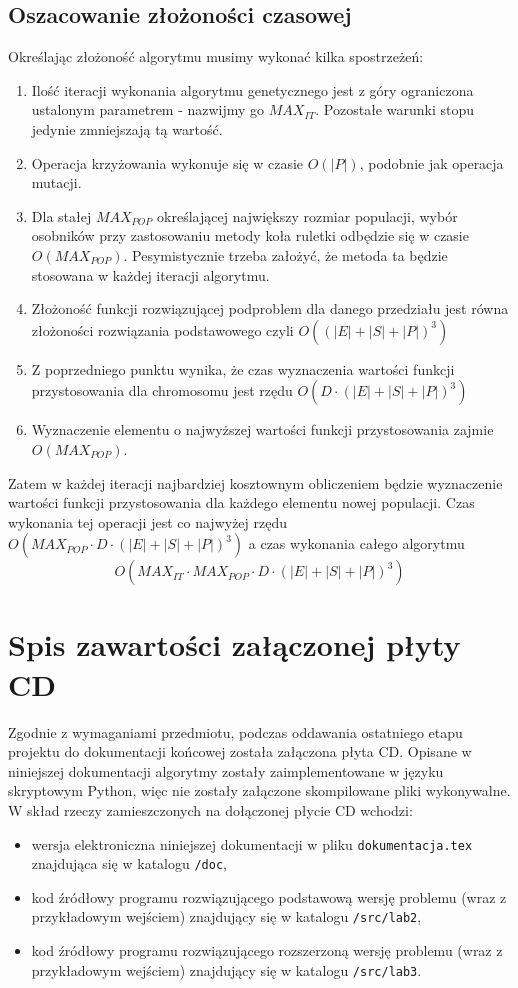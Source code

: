 \documentclass[12pt,a4paper]{article}
\theoremstyle{definition}
\begin{document}
\subsection{Oszacowanie złożoności czasowej} \label{complexity}
Określając złożoność algorytmu musimy wykonać kilka spostrzeżeń:
\begin{enumerate}
	\item Ilość iteracji wykonania algorytmu genetycznego jest z góry ograniczona ustalonym parametrem - nazwijmy go $MAX_{IT}$. Pozostałe warunki stopu jedynie zmniejszają tą wartość.
	\item Operacja krzyżowania wykonuje się w czasie $O(|P|)$, podobnie jak operacja mutacji.
	\item Dla stałej $MAX_{POP}$ określającej największy rozmiar populacji, wybór osobników przy zastosowaniu metody koła ruletki odbędzie się w czasie $O(MAX_{POP})$. Pesymistycznie trzeba założyć, że metoda ta będzie stosowana w każdej iteracji algorytmu.
	\item Złożoność funkcji rozwiązującej podproblem dla danego przedziału jest równa złożoności rozwiązania podstawowego czyli $O((|E| + |S| + |P|)^3)$
	\item Z poprzedniego punktu wynika, że czas wyznaczenia wartości funkcji przystosowania dla chromosomu jest rzędu $O(D \cdot (|E| + |S| + |P|)^3)$
	\item Wyznaczenie elementu o najwyższej wartości funkcji przystosowania zajmie \\$O(MAX_{POP})$.
\end{enumerate}
Zatem w każdej iteracji najbardziej kosztownym obliczeniem będzie wyznaczenie wartości funkcji przystosowania dla każdego elementu nowej populacji. Czas wykonania tej operacji jest co najwyżej rzędu $O(MAX_{POP} \cdot D \cdot (|E| + |S| + |P|)^3)$ a czas wykonania całego algorytmu
$$O(MAX_{IT} \cdot MAX_{POP} \cdot D \cdot (|E| + |S| + |P|)^3)$$

\newpage
\section{Spis zawartości załączonej płyty CD}
Zgodnie z wymaganiami przedmiotu, podczas oddawania ostatniego etapu projektu do dokumentacji końcowej została załączona płyta CD. Opisane w niniejszej dokumentacji algorytmy zostały zaimplementowane w języku skryptowym Python, więc nie zostały załączone skompilowane pliki wykonywalne.\\

\noindent
W skład rzeczy zamieszczonych na dołączonej płycie CD wchodzi:
\begin{itemize}
	\item wersja elektroniczna niniejszej dokumentacji w pliku \texttt{dokumentacja.tex} znajdująca się w katalogu \texttt{/doc},
	\item kod źródłowy programu rozwiązującego podstawową wersję problemu (wraz z przykładowym wejściem) znajdujący się w katalogu \texttt{/src/lab2},
	\item kod źródłowy programu rozwiązującego rozszerzoną wersję problemu (wraz z przykładowym wejściem) znajdujący się w katalogu \texttt{/src/lab3}.
\end{itemize}
\end{document}
